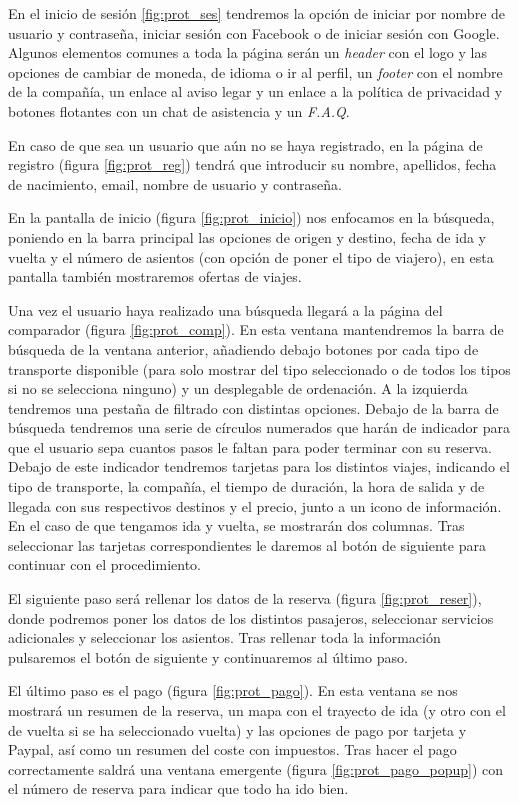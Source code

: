 En el inicio de sesión \ref{fig:prot_ses} tendremos la opción de iniciar por nombre de usuario y contraseña, iniciar sesión con Facebook o de iniciar sesión con Google. Algunos elementos comunes a toda la página serán un \textit{header} con el logo y las opciones de cambiar de moneda, de idioma o ir al perfil, un \textit{footer} con el nombre de la compañía, un enlace al aviso legar y un enlace a la política de privacidad y botones flotantes con un chat de asistencia y un \textit{F.A.Q}.

En caso de que sea un usuario que aún no se haya registrado, en la página de registro (figura \ref{fig:prot_reg}) tendrá que introducir su nombre, apellidos, fecha de nacimiento, email, nombre de usuario y contraseña.

En la pantalla de inicio (figura \ref{fig:prot_inicio}) nos enfocamos en la búsqueda, poniendo en la barra principal las opciones de origen y destino, fecha de ida y vuelta y el número de asientos (con opción de poner el tipo de viajero), en esta pantalla también mostraremos ofertas de viajes. 

Una vez el usuario haya realizado una búsqueda llegará a la página del comparador (figura \ref{fig:prot_comp}). En esta ventana mantendremos la barra de búsqueda de la ventana anterior, añadiendo debajo botones por cada tipo de transporte disponible (para solo mostrar del tipo seleccionado o de todos los tipos si no se selecciona ninguno) y un desplegable de ordenación. A la izquierda tendremos una pestaña de filtrado con distintas opciones. Debajo de la barra de búsqueda tendremos una serie de círculos numerados que harán de indicador para que el usuario sepa cuantos pasos le faltan para poder terminar con su reserva. Debajo de este indicador tendremos tarjetas para los distintos viajes, indicando el tipo de transporte, la compañía, el tiempo de duración, la hora de salida y de llegada con sus respectivos destinos y el precio, junto a un icono de información. En el caso de que tengamos ida y vuelta, se mostrarán dos columnas. Tras seleccionar las tarjetas correspondientes le daremos al botón de siguiente para continuar con el procedimiento.

El siguiente paso será rellenar los datos de la reserva (figura \ref{fig:prot_reser}), donde podremos poner los datos de los distintos pasajeros, seleccionar servicios adicionales y seleccionar los asientos. Tras rellenar toda la información pulsaremos el botón de siguiente y continuaremos al último paso.

El último paso es el pago (figura \ref{fig:prot_pago}). En esta ventana se nos mostrará un resumen de la reserva, un mapa con el trayecto de ida (y otro con el de vuelta si se ha seleccionado vuelta) y las opciones de pago por tarjeta y Paypal, así como un resumen del coste con impuestos. Tras hacer el pago correctamente saldrá una ventana emergente (figura \ref{fig:prot_pago_popup}) con el número de reserva para indicar que todo ha ido bien.

